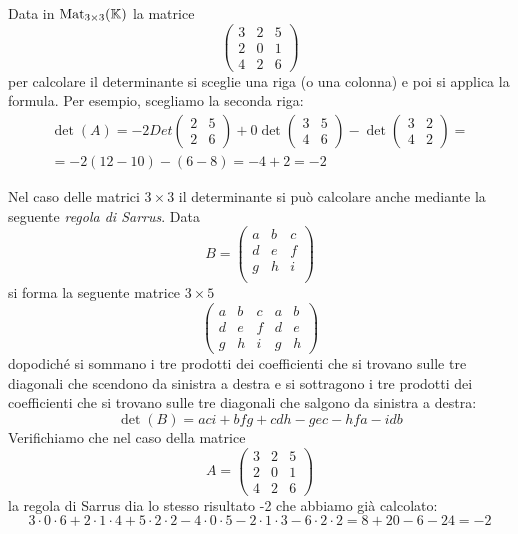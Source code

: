 \begin{example}
	Data in $\operatorname{Mat}_{3 \times 3}(\mathbb{K})$ la matrice
	\[
		\begin{pmatrix}
			3 & 2 & 5 \\
			2 & 0 & 1 \\
			4 & 2 & 6
		\end{pmatrix}
	\]
	per calcolare il determinante si sceglie una riga (o una colonna) e poi si
	applica la formula. Per esempio, scegliamo la seconda riga:
	\begin{gather*}
		\det(A) = -2Det \begin{pmatrix}
			2 & 5 \\
			2 & 6
		\end{pmatrix} +
		0 \det \begin{pmatrix}
			3 & 5 \\
			4 & 6
		\end{pmatrix} -
		\det \begin{pmatrix}
			3 & 2 \\
			4 & 2
		\end{pmatrix} = \\
		= -2(12 - 10) - (6 - 8) = -4 + 2 = -2
	\end{gather*}
\end{example}

\begin{observation}
	Nel caso delle matrici $3 \times 3$ il determinante si può calcolare
	anche mediante la seguente \emph{regola di Sarrus}. Data
	\[
		B = \begin{pmatrix}
			a & b & c \\
			d & e & f \\
			g & h & i \\
		\end{pmatrix}
	\]
	si forma la seguente matrice $3 \times 5$
	\[
		\begin{pmatrix}
			a & b & c & a & b \\
			d & e & f & d & e \\
			g & h & i & g & h
		\end{pmatrix}
	\]
	dopodiché si sommano i tre prodotti dei coefficienti che si trovano sulle
	tre diagonali che scendono da sinistra a destra e si sottragono i tre
	prodotti dei coefficienti che si trovano sulle tre diagonali che salgono
	da sinistra a destra:
	\[
		\det(B) = aci + bfg + cdh - gec - hfa - idb
	\]
	Verifichiamo che nel caso della matrice
	\[
		A = \begin{pmatrix}
			3 & 2 & 5 \\
			2 & 0 & 1 \\
			4 & 2 & 6
		\end{pmatrix}
	\]
	la regola di Sarrus dia lo stesso risultato -2 che abbiamo già calcolato:
	\[
		3 \cdot 0 \cdot 6 + 2 \cdot 1 \cdot 4 + 5 \cdot 2 \cdot 2 -
		4 \cdot 0 \cdot 5 - 2 \cdot 1 \cdot 3 - 6 \cdot 2 \cdot 2 =
		8 + 20 - 6 - 24 = -2
	\]
\end{observation}
